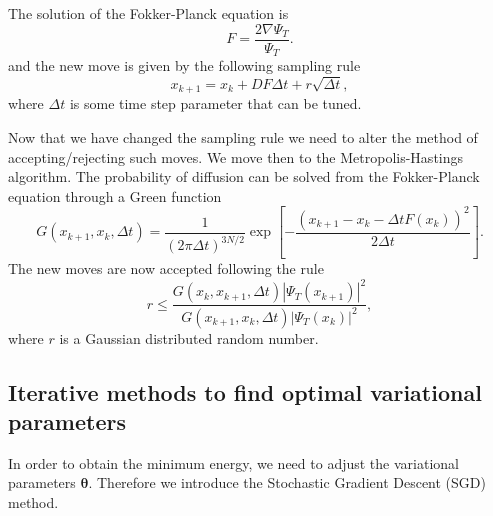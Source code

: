 The solution of the Fokker-Planck equation is 
\begin{equation*}
F = \frac{2\nabla \Psi_T}{\Psi_T}.
\end{equation*}
and the new move is given by the following sampling rule
\begin{equation*}
x_{k+1} = x_k + DF\Delta t + r\sqrt{\Delta t},
\end{equation*}
where $\Delta t$ is some time step parameter that can be tuned. 

Now that we have changed the sampling rule we need to alter the method of accepting/rejecting such moves. We move then to the Metropolis-Hastings algorithm. The probability of diffusion can be solved from the Fokker-Planck equation through a Green function
\begin{equation*}
G(x_{k+1},x_k,\Delta t) = \frac{1}{(2\pi\Delta t)^{3N/2}}\exp\left[ -\frac{\left(x_{k+1} - x_{k} - \Delta tF(x_k)\right)^2}{2\Delta t}  \right].
\end{equation*}
The new moves are now accepted following the rule 
\begin{equation}
r \leq \frac{G(x_k, x_{k+1}, \Delta t)|\Psi_T(x_{k+1})|^2}{G(x_{k+1}, x_{k}, \Delta t)|\Psi_T(x_{k})|^2},
\label{eq_imp_sam}
\end{equation}
where $r$ is a Gaussian distributed random number. 

\subsection{Iterative methods to find optimal variational parameters}
In order to obtain the minimum energy, we need to adjust the variational parameters $\boldsymbol{\theta}$.%
Therefore we introduce the Stochastic Gradient Descent (SGD) method.

